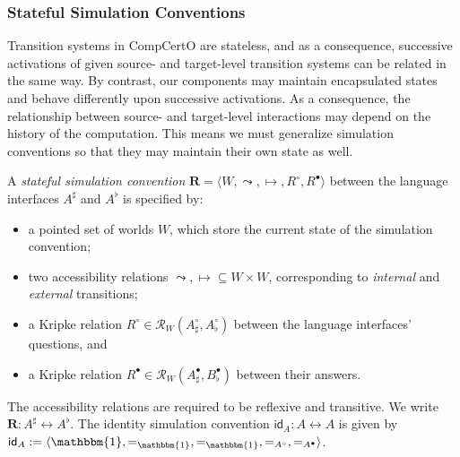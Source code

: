 \documentclass[acmsmall,screen,review,anonymous]{acmart}
\newcommand{\kw}[1]{\ensuremath{ \mathsf{#1} }}
\newcommand{\que}{\circ}
\newcommand{\ans}{\bullet}
\begin{document}
\subsubsection{Stateful Simulation Conventions} %

Transition systems in CompCertO are stateless,
and as a consequence,
successive activations of given
source- and target-level
transition systems can be related in the same way.
By contrast,
our components may maintain encapsulated states
and behave differently upon successive activations.
As a consequence,
the relationship between source- and target-level interactions
may depend on the history of the computation.
This means we must generalize simulation conventions
so that they may maintain their own state as well.

\begin{definition} \label{def:sconv} %
A \emph{stateful simulation convention}
$\mathbf{R} = \langle W, {\leadsto}, {\mapsto}, R^\que, R^\ans \rangle$
between the language interfaces $A^\sharp$ and $A^\flat$
is specified by:
\begin{itemize}
  \item a pointed set of worlds $W$,
    which store the current state of the simulation convention;
  \item two accessibility relations
    ${\leadsto}, {\mapsto} \subseteq W \times W$,
    corresponding to \emph{internal} and \emph{external} transitions;
  \item a Kripke relation $R^\que \in \mathcal{R}_W(A_\sharp^\que, A_\flat^\que)$
    between the language interfaces' questions, and
  \item a Kripke relation $R^\ans \in \mathcal{R}_W(A_\sharp^\ans, B_\flat^\ans)$
    between their answers.
\end{itemize}
The accessibility relations are required to be reflexive and transitive.
We write $\mathbf{R} : A^\sharp \leftrightarrow A^\flat$.
The identity simulation convention
$\kw{id}_A : A \leftrightarrow A$
is given by
$\kw{id}_A := \langle
    \mathbbm{1}, {=}_\mathbbm{1}, {=}_\mathbbm{1}, {=}_{A^\que}, {=}_{A^\ans}
 \rangle$.
\end{definition}
\end{document}
